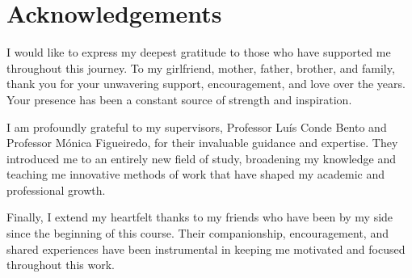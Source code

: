 


% 
% 
% 

\begingroup
\let\clearpage\relax
\let\cleardoublepage\relax
\let\cleardoublepage\relax
\chapter*{Acknowledgements}
I would like to express my deepest gratitude to those who have supported me throughout this journey. To my girlfriend, mother, father, brother, and family, thank you for your unwavering support, encouragement, and love over the years. Your presence has been a constant source of strength and inspiration.

I am profoundly grateful to my supervisors, Professor Luís Conde Bento and Professor Mónica Figueiredo, for their invaluable guidance and expertise. They introduced me to an entirely new field of study, broadening my knowledge and teaching me innovative methods of work that have shaped my academic and professional growth.

Finally, I extend my heartfelt thanks to my friends who have been by my side since the beginning of this course. Their companionship, encouragement, and shared experiences have been instrumental in keeping me motivated and focused throughout this work.

\endgroup


